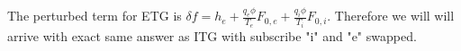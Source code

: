 The perturbed term for ETG is 
$\delta f= h_e + \frac{q_e \phi}{T_e} F_{0,e}+ \frac{q_i \phi}{T_i} F_{0,i}$.
Therefore we will will arrive with exact same answer as ITG with subscribe "i" and "e" swapped. 

